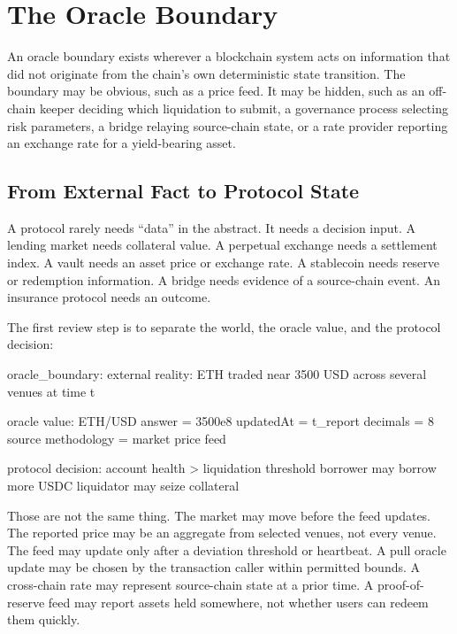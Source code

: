 \section{The Oracle Boundary}

An oracle boundary exists wherever a blockchain system acts on information that did not originate from the chain's own deterministic state transition. The boundary may be obvious, such as a price feed. It may be hidden, such as an off-chain keeper deciding which liquidation to submit, a governance process selecting risk parameters, a bridge relaying source-chain state, or a rate provider reporting an exchange rate for a yield-bearing asset.

\subsection{From External Fact to Protocol State}

A protocol rarely needs ``data'' in the abstract. It needs a decision input. A lending market needs collateral value. A perpetual exchange needs a settlement index. A vault needs an asset price or exchange rate. A stablecoin needs reserve or redemption information. A bridge needs evidence of a source-chain event. An insurance protocol needs an outcome.

The first review step is to separate the world, the oracle value, and the protocol decision:

\begin{codeblock}
oracle_boundary:
    external reality:
        ETH traded near 3500 USD across several venues at time t

    oracle value:
        ETH/USD answer = 3500e8
        updatedAt = t_report
        decimals = 8
        source methodology = market price feed

    protocol decision:
        account health > liquidation threshold
        borrower may borrow more USDC
        liquidator may seize collateral
\end{codeblock}

Those are not the same thing. The market may move before the feed updates. The reported price may be an aggregate from selected venues, not every venue. The feed may update only after a deviation threshold or heartbeat. A pull oracle update may be chosen by the transaction caller within permitted bounds. A cross-chain rate may represent source-chain state at a prior time. A proof-of-reserve feed may report assets held somewhere, not whether users can redeem them quickly.

